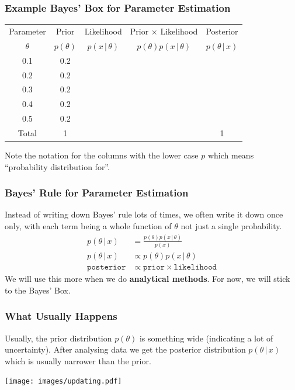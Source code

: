 \documentclass{beamer}
\newcommand{\given}{\,|\,}
\begin{document}
\begin{frame}
\frametitle{Example Bayes' Box for Parameter Estimation}
\begin{tabular}{|c|c|c|c|c|}
\hline
Parameter & Prior & Likelihood & Prior $\times$ Likelihood & Posterior \\
$\theta$  & $p(\theta)$ & $p(x \given \theta)$ & $p(\theta)p(x\given\theta)$ & $p(\theta\given x)$ \\
\hline
0.1 & 0.2  &  & & \\
0.2 & 0.2  &  & & \\
0.3 & 0.2 &  & & \\
0.4 & 0.2  &  & & \\
0.5 & 0.2 & & & \\
\hline
Total & 1 & & & 1 \\
\hline
\end{tabular}
\pause
\vspace{1em}

Note the notation for the columns with the lower case $p$
which means ``probability distribution for''.


\end{frame}


\begin{frame}
\frametitle{Bayes' Rule for Parameter Estimation}
Instead of writing down Bayes' rule lots of times, we often write it down
once only, with each term being a whole function of $\theta$ not just
a single probability.\pause
\begin{align}
p(\theta \given x) &= \frac{p(\theta)p(x \given \theta)}{p(x)} \\
p(\theta \given x) &\propto p(\theta)p(x \given \theta) \\
\texttt{posterior} &\propto \texttt{prior} \times \texttt{likelihood}
\end{align}
\pause
We will use this more when we do {\bf analytical methods}. For now, we will
stick to the Bayes' Box.


\end{frame}


\begin{frame}
\frametitle{What Usually Happens}
Usually, the prior distribution $p(\theta)$ is something wide (indicating
a lot of uncertainty). After analysing data we get the posterior distribution
$p(\theta \given x)$ which is usually narrower than the prior.

\begin{center}
\texttt{[image: images/updating.pdf]}
\end{center}

\end{frame}
\end{document}
